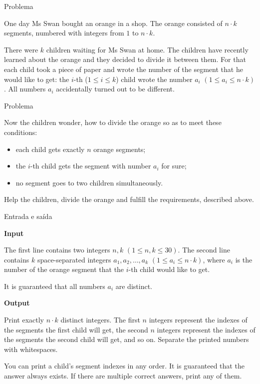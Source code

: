 
\begin{frame}[fragile]{Problema}

One day Ms Swan bought an orange in a shop. The orange consisted of $n\cdot k$ segments, numbered 
with integers from $1$ to $n\cdot k$.

There were $k$ children waiting for Ms Swan at home. The children have recently learned about the 
orange and they decided to divide it between them. For that each child took a piece of paper and 
wrote the number of the segment that he would like to get: the $i$-th ($1\leq i \leq k$) child 
wrote the number $a_i$ $(1\leq a_i \leq n\cdot k)$. All numbers $a_i$ accidentally turned out to be 
different.

\end{frame}

\begin{frame}[fragile]{Problema}

Now the children wonder, how to divide the orange so as to meet these conditions:

\begin{itemize}
    \item each child gets exactly $n$ orange segments;
    \item the $i$-th child gets the segment with number $a_i$ for sure;
    \item no segment goes to two children simultaneously.
\end{itemize}

Help the children, divide the orange and fulfill the requirements, described above.

\end{frame}

\begin{frame}[fragile]{Entrada e saída}

\textbf{Input}

The first line contains two integers $n, k$ $(1\leq n, k\leq 30)$. The second line contains 
$k$ space-separated integers $a_1, a_2, \ldots, a_k$ $(1\leq a_i\leq n\cdot k)$, where $a_i$ is 
the number of the orange segment that the $i$-th child would like to get.

It is guaranteed that all numbers $a_i$ are distinct.

\textbf{Output}

Print exactly $n\cdot k$ distinct integers. The first $n$ integers represent the indexes of the 
segments the first child will get, the second $n$ integers represent the indexes of the segments 
the second child will get, and so on. Separate the printed numbers with whitespaces.

You can print a child's segment indexes in any order. It is guaranteed that the answer always 
exists. If there are multiple correct answers, print any of them.

\end{frame}

